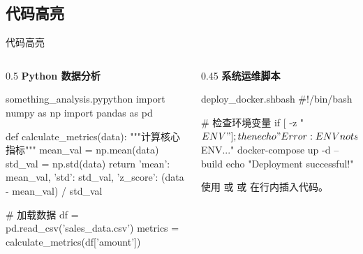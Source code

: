 \subsection{代码高亮}
\begin{frame}[fragile]{代码高亮}
    \begin{columns}[T]
        \begin{column}{0.5\textwidth}
            \textbf{\color{main} Python 数据分析}
            \begin{iCodeEnv}{something\_analysis.py}{python}
import numpy as np
import pandas as pd

def calculate_metrics(data):
    """计算核心指标"""
    mean_val = np.mean(data)
    std_val = np.std(data)
    return {
        'mean': mean_val,
        'std': std_val,
        'z_score': (data - mean_val) / std_val
    }

# 加载数据
df = pd.read_csv('sales_data.csv')
metrics = calculate_metrics(df['amount'])
            \end{iCodeEnv}
        \end{column}
        \begin{column}{0.45\textwidth}
            \textbf{\color{main} 系统运维脚本}
            \begin{iCodeEnv}{deploy\_docker.sh}{bash}
#!/bin/bash

# 检查环境变量
if [ -z "$ENV" ]; then
    echo "Error: ENV not set"
    exit 1
fi

echo "Deploying to $ENV..."
docker-compose up -d --build
echo "Deployment successful!"
            \end{iCodeEnv}
            \vspace{0.5em}
            \small
            使用  或  或  在行内插入代码。
        \end{column}
    \end{columns}
\end{frame}

